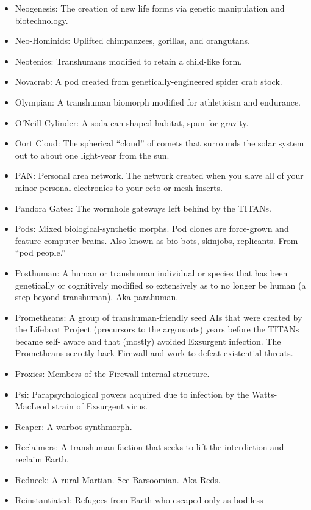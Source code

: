 \begin{itemize}
\item Neogenesis: The creation of new life forms via genetic
  manipulation and biotechnology.
\item Neo-Hominids: Uplifted chimpanzees, gorillas, and orangutans.
\item Neotenics: Transhumans modified to retain a child-like form.
\item Novacrab: A pod created from genetically-engineered spider crab
  stock.
\item Olympian: A transhuman biomorph modified for athleticism and
  endurance.
\item O'Neill Cylinder: A soda-can shaped habitat, spun for gravity.
\item Oort Cloud: The spherical ``cloud'' of comets that surrounds the
  solar system out to about one light-year from the sun.
\item PAN: Personal area network. The network created when you slave
  all of your minor personal electronics to your ecto or mesh inserts.
\item Pandora Gates: The wormhole gateways left behind by the TITANs.
\item Pods: Mixed biological-synthetic morphs. Pod clones are
  force-grown and feature computer brains. Also known as bio-bots,
  skinjobs, replicants. From ``pod people.''
\item Posthuman: A human or transhuman individual or species that has
  been genetically or cognitively modified so extensively as to no
  longer be human (a step beyond transhuman). Aka parahuman.
\item Prometheans: A group of transhuman-friendly seed AIs that were
  created by the Lifeboat Project (precursors to the argonauts) years
  before the TITANs became self- aware and that (mostly) avoided
  Exsurgent infection. The Prometheans secretly back Firewall and work
  to defeat existential threats.
\item Proxies: Members of the Firewall internal structure.
\item Psi: Parapsychological powers acquired due to infection by the
  Watts-MacLeod strain of Exsurgent virus.
\item Reaper: A warbot synthmorph.
\item Reclaimers: A transhuman faction that seeks to lift the
  interdiction and reclaim Earth.
\item Redneck: A rural Martian. See Barsoomian. Aka Reds.
\item Reinstantiated: Refugees from Earth who escaped only as bodiless

\end{itemize}
